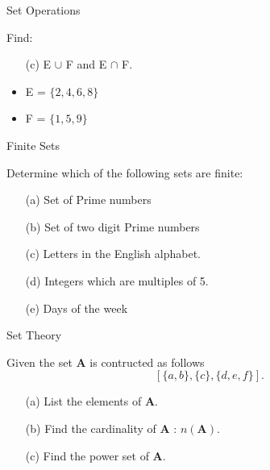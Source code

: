 \documentclass[11pt,a4paper,titlepage,oneside,openany]{article}
\numberwithin{equation}{section}
\numberwithin{algorithm}{section}
\numberwithin{figure}{section}
\numberwithin{table}{section}
\begin{document}
{%

{Set Operations}

Find: 
\begin{itemize}
\item[(c)] E $\cup$ F and E $\cap$ F. \bigskip
\item E = $\{2, 4, 6, 8\}$

\item F = $\{1, 5, 9\}$
\end{itemize}




{Finite Sets}

Determine which of the following sets are finite:
\begin{itemize}
\item[(a)] Set of Prime numbers %
\item[(b)] Set of two digit Prime numbers %
\item[(c)] Letters in the English alphabet.
\item[(d)] Integers which are multiples of 5.
\item[(e)] Days of the week %
\end{itemize}







{Set Theory}

Given the set \textbf{A} is contructed as follows 
\[ [\{a, b\}, \{c\}, \{d, e, f \} ]. \]

\begin{itemize}
\item[(a)] List the elements of \textbf{A}. 
\item[(b)] Find the cardinality of \textbf{A} : $n(\boldsymbol{A})$. 
\item[(c)] Find the power set of \textbf{A}.
\end{itemize}



}
\end{document}
